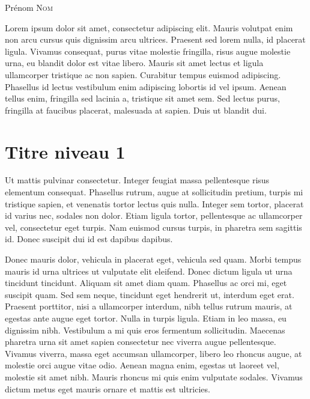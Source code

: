 \documentclass{FramateX}
\begin{document}
\begin{refsection}


\begin{flushright}
Prénom \textsc{Nom}
\end{flushright}
\vspace{10 mm}




Lorem ipsum dolor sit amet, consectetur adipiscing elit. Mauris volutpat enim non arcu cursus quis dignissim arcu ultrices. Praesent sed lorem nulla, id placerat ligula. Vivamus consequat, purus vitae molestie fringilla, risus augue molestie urna, eu blandit dolor est vitae libero. Mauris sit amet lectus et ligula ullamcorper tristique ac non sapien. Curabitur tempus euismod adipiscing. Phasellus id lectus vestibulum enim adipiscing lobortis id vel ipsum. Aenean tellus enim, fringilla sed lacinia a, tristique sit amet sem. Sed lectus purus, fringilla at faucibus placerat, malesuada at sapien. Duis ut blandit dui.

\section*{Titre niveau 1}
{}

Ut mattis pulvinar consectetur. Integer feugiat massa pellentesque risus elementum consequat. Phasellus rutrum, augue at sollicitudin pretium, turpis mi tristique sapien, et venenatis tortor lectus quis nulla. Integer sem tortor, placerat id varius nec, sodales non dolor. Etiam ligula tortor, pellentesque ac ullamcorper vel, consectetur eget turpis. Nam euismod cursus turpis, in pharetra sem sagittis id. Donec suscipit dui id est dapibus dapibus.

Donec mauris dolor, vehicula in placerat eget, vehicula sed quam. Morbi tempus mauris id urna ultrices ut vulputate elit eleifend. Donec dictum ligula ut urna tincidunt tincidunt. Aliquam sit amet diam quam. Phasellus ac orci mi, eget suscipit quam. Sed sem neque, tincidunt eget hendrerit ut, interdum eget erat. Praesent porttitor, nisi a ullamcorper interdum, nibh tellus rutrum mauris, at egestas ante augue eget tortor. Nulla in turpis ligula. Etiam in leo massa, eu dignissim nibh. Vestibulum a mi quis eros fermentum sollicitudin. Maecenas pharetra urna sit amet sapien consectetur nec viverra augue pellentesque. Vivamus viverra, massa eget accumsan ullamcorper, libero leo rhoncus augue, at molestie orci augue vitae odio. Aenean magna enim, egestas ut laoreet vel, molestie sit amet nibh. Mauris rhoncus mi quis enim vulputate sodales. Vivamus dictum metus eget mauris ornare et mattis est ultricies.


\end{refsection}
\end{document}

